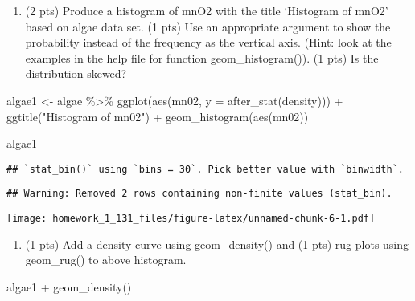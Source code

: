 \documentclass[
]{article}
\newenvironment{Shaded}{\begin{snugshade}}{\end{snugshade}}
\newcommand{\AttributeTok}[1]{\textcolor[rgb]{0.77,0.63,0.00}{#1}}
\newcommand{\FunctionTok}[1]{\textcolor[rgb]{0.00,0.00,0.00}{#1}}
\newcommand{\NormalTok}[1]{#1}
\newcommand{\OtherTok}[1]{\textcolor[rgb]{0.56,0.35,0.01}{#1}}
\newcommand{\SpecialCharTok}[1]{\textcolor[rgb]{0.00,0.00,0.00}{#1}}
\newcommand{\StringTok}[1]{\textcolor[rgb]{0.31,0.60,0.02}{#1}}
\providecommand{\tightlist}{%
  \setlength{\itemsep}{0pt}\setlength{\parskip}{0pt}}
\begin{document}
\begin{enumerate}
\def\labelenumi{\alph{enumi}.}
\tightlist
\item
  (2 pts) Produce a histogram of mnO2 with the title `Histogram of mnO2'
  based on algae data set. (1 pts) Use an appropriate argument to show
  the probability instead of the frequency as the vertical axis. (Hint:
  look at the examples in the help file for function geom\_histogram()).
  (1 pts) Is the distribution skewed?
\end{enumerate}

\begin{Shaded}
\begin{Highlighting}[]
\NormalTok{algae1 }\OtherTok{\textless{}{-}}\NormalTok{ algae }\SpecialCharTok{\%\textgreater{}\%}
  \FunctionTok{ggplot}\NormalTok{(}\FunctionTok{aes}\NormalTok{(mn02, }\AttributeTok{y =} \FunctionTok{after\_stat}\NormalTok{(density))) }\SpecialCharTok{+} \FunctionTok{ggtitle}\NormalTok{(}\StringTok{"Histogram of mn02"}\NormalTok{) }\SpecialCharTok{+}
  \FunctionTok{geom\_histogram}\NormalTok{(}\FunctionTok{aes}\NormalTok{(mn02))}


\NormalTok{algae1}
\end{Highlighting}
\end{Shaded}

\begin{verbatim}
## `stat_bin()` using `bins = 30`. Pick better value with `binwidth`.
\end{verbatim}

\begin{verbatim}
## Warning: Removed 2 rows containing non-finite values (stat_bin).
\end{verbatim}

\texttt{[image: homework\_1\_131\_files/figure-latex/unnamed-chunk-6-1.pdf]}

\begin{enumerate}
\def\labelenumi{\alph{enumi}.}
\setcounter{enumi}{1}
\tightlist
\item
  (1 pts) Add a density curve using geom\_density() and (1 pts) rug
  plots using geom\_rug() to above histogram.
\end{enumerate}

\begin{Shaded}
\begin{Highlighting}[]
\NormalTok{algae1 }\SpecialCharTok{+} \FunctionTok{geom\_density}\NormalTok{()}
\end{Highlighting}
\end{Shaded}
\end{document}

